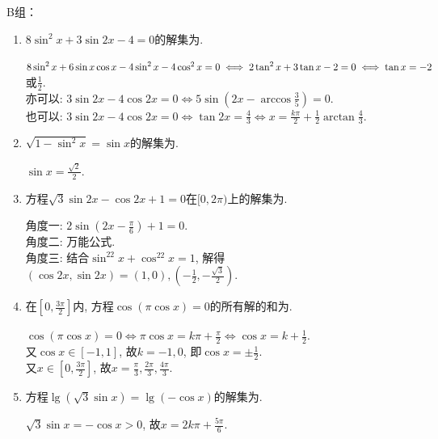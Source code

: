 B组：
\begin{enumerate}

\item $8\sin^2x+3\sin2x-4=0$的解集为. 
\begin{jieda}
$8\sin^2x+6\sin{x}\cos{x}-4\sin^2x-4\cos^2x=0\\
\iff 2\tan^2x+3\tan{x}-2=0\iff\tan{x}=-2$或$\frac{1}{2}$. \\
亦可以: $3\sin2x-4\cos2x=0\iff 5\sin(2x-\arccos\frac{3}{5})=0$. \\
也可以: $3\sin2x-4\cos2x=0\iff \tan2x=\frac{4}{3}\iff x=\frac{k\pi}{2}+\frac{1}{2}\arctan\frac{4}{3}$. 
\end{jieda}

\item $\sqrt{1-\sin^2x}=\sin{x}$的解集为. 
\begin{jieda}
$\sin{x}=\frac{\sqrt{2}}{2}$.
\end{jieda}

\item 方程$\sqrt{3}\sin2x-\cos2x+1=0$在$[0,2\pi)$上的解集为. 
\begin{jieda}
角度一: $2\sin(2x-\frac{\pi}{6})+1=0$. \\
角度二: 万能公式. \\
角度三: 结合$\sin^22x+\cos^22x=1$, 解得$(\cos2x,\sin2x)=(1,0),(-\frac{1}{2},-\frac{\sqrt{3}}{2})$. 
\end{jieda}


\item 在$[0,\frac{3\pi}{2}]$内, 方程$\cos(\pi\cos{x})=0$的所有解的和为. 
\begin{jieda}
$\cos(\pi\cos{x})=0\iff\pi\cos{x}=k\pi+\frac{\pi}{2}\iff\cos{x}=k+\frac{1}{2}$. \\
又$\cos{x}\in[-1,1]$, 故$k=-1,0$, 即$\cos{x}=\pm\frac{1}{2}$. \\
又$x\in[0,\frac{3\pi}{2}]$, 故$x=\frac{\pi}{3},\frac{2\pi}{3},\frac{4\pi}{3}$. 
\end{jieda}

\item 方程$\lg(\sqrt{3}\sin{x})=\lg(-\cos{x})$的解集为. 
\begin{jieda}
$\sqrt{3}\sin{x}=-\cos{x}>0$, 故$x=2k\pi+\frac{5\pi}{6}$. 
\end{jieda}


\end{enumerate}
